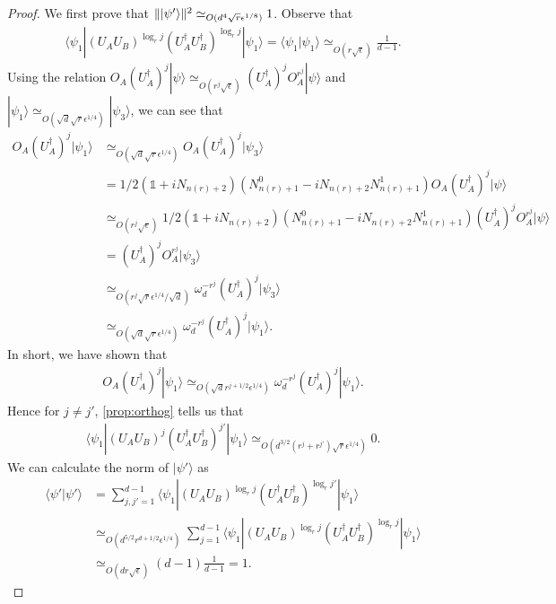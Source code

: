 \documentclass[11pt,letterpaper]{article}
\newcommand{\ket}[1]{|#1\rangle}
\newcommand{\bra}[1]{\langle#1|}
\newcommand{\braket}[2]{\langle#1|#2\rangle}
\newcommand{\ct}{^{\dagger}}
\DeclarePairedDelimiter{\norm}{\lVert}{\rVert}
\newcommand{\1}{\mathbb{1}}
\newcommand{\nr}{n(r)}
\newcommand{\ep}{\epsilon}
\newcommand{\se}{\sqrt{\epsilon}}
\newcommand{\qe}{\epsilon^{1/4}}
\newcommand{\sd}{\sqrt{d}}
\newcommand{\sr}{\sqrt{r}}
\newcommand{\appd}[1]{\simeq_{#1}}
\theoremstyle{definition}
\begin{document}
\begin{proof}
	We first prove that $\norm{\ket{\psi'}}^2 \appd{O(d^4 \sr \ep^{1/8})} 1$.
	Observe that 
	\begin{align*}
		\bra{\psi_1} (U_AU_B)^{\log_r j} (U_A\ct U_B\ct)^{\log_r j}  \ket{\psi_1} =
		\braket{\psi_1}{\psi_1} \appd{O(r\se)} \frac{1}{d-1}.
	\end{align*}
	Using the relation $O_A(U_A\ct)^j \ket{\psi} \appd{O(r^j \se)} (U_A\ct)^j O_A^{r^j}\ket{\psi}$ and $\ket{\psi_1} \appd{O(\sd \sr \qe)} \ket{\psi_3}$,
        we can see that 
        \begin{align*}
            	O_A (U_A\ct)^j \ket{\psi_1} &\appd{O(\sd \sr \qe)} O_A(U_A\ct)^j \ket{\psi_3} \\
            	& = 1/2 (\1 + i N_{\nr+2})(N_{\nr+1}^0 - iN_{\nr+2}N_{\nr+1}^1) O_A (U_A\ct)^j \ket{\psi} \\
            	& \appd{O(r^j \se)} 1/2  (\1 + i N_{\nr+2})(N_{\nr+1}^0 - iN_{\nr+2}N_{\nr+1}^1)  (U_A\ct)^j O_A^{r^j} \ket{\psi} \\
            	& = (U_A\ct)^j O_A^{r^j} \ket{\psi_3} \\
            	& \appd{O(r^j \sr \qe/\sd)} \omega_d^{-r^j}(U_A\ct)^j \ket{\psi_3} \\
            	& \appd{O(\sd \sr\qe)} \omega_d^{-r^j}  (U_A\ct)^j \ket{\psi_1}.
        \end{align*}
        In short, we have shown that 
        \begin{align}
        		O_A (U_A\ct)^j \ket{\psi_1} \appd{O(\sd r^{j+1/2} \qe)}\omega_d^{-r^j}  (U_A\ct)^j \ket{\psi_1}.
        \end{align}
	Hence for $j \neq j'$, \cref{prop:orthog} tells us that  
	\begin{align}
		\bra{\psi_1} (U_AU_B)^{j} (U_A\ct U_B\ct)^{ j'} \ket{\psi_1} \appd{O(d^{3/2} (r^j + r^{j'})\sr \qe)} 0.
	\end{align}
	We can calculate the norm of $\ket{\psi'}$ as 
	\begin{align*}
		\braket{\psi'}{\psi'} &=\sum_{j,j'=1}^{d-1} \bra{\psi_1} (U_AU_B)^{\log_r j} (U_A\ct U_B\ct)^{\log_r j'} \ket{\psi_1}\\
		&\appd{O(d^{5/2} r^{d+1/2} \qe)} \sum_{j=1}^{d-1} \bra{\psi_1} (U_AU_B)^{\log_r j} (U_A\ct U_B\ct)^{\log_r j} \ket{\psi_1}\\
		&\appd{O(dr\se)} (d-1) \frac{1}{d-1} = 1.
	\end{align*}
	

\end{proof}
\end{document}
